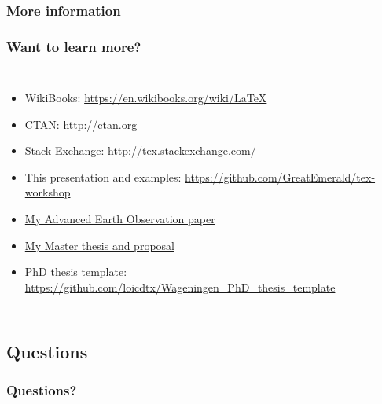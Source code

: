 \documentclass[xetex,colorlinks]{beamer} %
\begin{document}
  \subsubsection{More information}
  \begin{frame}
    \frametitle{Want to learn more?}
    \begin{columns}
      \begin{itemize}
	\item WikiBooks: \href{https://en.wikibooks.org/wiki/LaTeX}{https://en.wikibooks.org/wiki/LaTeX}
	\item CTAN: \href{http://ctan.org}{http://ctan.org}
	\item Stack Exchange: \href{http://tex.stackexchange.com/}{http://tex.stackexchange.com/}
	\item This presentation and examples: \href{https://github.com/GreatEmerald/tex-workshop}{https://github.com/GreatEmerald/tex-workshop}
	\item \href{https://github.com/GreatEmerald/AEO-validation-paper/tree/master/paper}{My Advanced Earth Observation paper}
	\item \href{https://github.com/GreatEmerald/master-classification/tree/master/thesis}{My Master thesis and proposal}
	\item PhD thesis template: \href{https://github.com/loicdtx/Wageningen\_PhD\_thesis\_template}{https://github.com/loicdtx/Wageningen\_PhD\_thesis\_template}
      \end{itemize}
      
    \end{columns}
  \end{frame}
  
  \subsection{Questions}
  \begin{frame}
    \frametitle{Questions?}
    \tableofcontents[sectionstyle=shaded/show,subsectionstyle=shaded/shaded/show,subsubsectionstyle=shaded/shaded/shaded/show]
  \end{frame}

  
\end{document}
